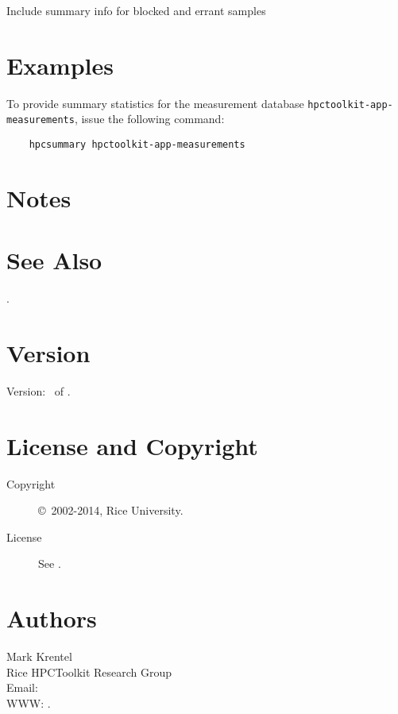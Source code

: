 \documentclass[english]{article}
\begin{document}
\begin{Description}

\item[\Opt{--all}]
Include summary info for blocked and errant samples

\end{Description}


\section{Examples}

To provide summary statistics for the measurement database \texttt{hpctoolkit-app-measurements}, issue the following command:
\begin{verbatim}
    hpcsummary hpctoolkit-app-measurements
\end{verbatim}


\section{Notes}


\section{See Also}

.

\section{Version}

Version: \Version\ of \Date.

\section{License and Copyright}

\begin{description}
\item[Copyright] \copyright\ 2002-2014, Rice University.
\item[License] See .
\end{description}

\section{Authors}

\noindent
Mark Krentel \\
Rice HPCToolkit Research Group \\
Email:  \\
WWW: .

\LatexManEnd
\end{document}
